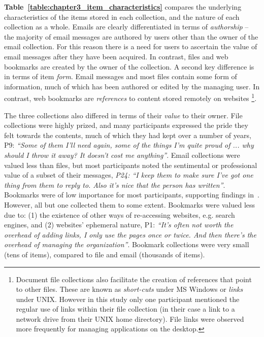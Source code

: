 \textbf{Table~\ref{table:chapter3_item_characteristics}} compares the underlying characteristics of the items stored in each collection, and the nature of each collection as a whole. 
Emails are clearly differentiated in terms of \textit{authorship} -- the majority of email messages are authored by users other than the owner of the email collection.
For this reason there is a need for users to ascertain the value of email messages after they have been acquired.  In contrast, files and web bookmarks are created by the owner of the collection.  
A second key difference is in terms of item \textit{form}. Email messages and most files contain some form of information, much of which has been authored or edited by the managing user. In contrast, web bookmarks are \textit{references} to content stored remotely on websites \footnote{Document file collections also facilitate the creation of references that point to other files. These are known as \textit{short-cuts} under MS Windows or \textit{links} under UNIX. However in this study only one participant mentioned the regular use of links within their file collection (in their case a link to a network drive from their UNIX home directory). File links were observed more frequently for managing applications on the desktop.}.

The three collections also differed in terms of their \textit{value} to their owner.  File collections were highly prized, and many participants expressed the pride they felt towards the contents, much of which they had kept over a number of years, P9: \textit{``Some of them I'll need again, some of the things I'm quite proud of ... why should I throw it away? It doesn't cost me anything''}. Email collections were valued less than files, but most participants noted the sentimental or professional value of a subset of their messages, \textit{P24: ``I keep them to make sure I've got one thing from them to reply to. Also it's nice that the person has written''}. Bookmarks were of low importance for most participants, supporting findings in~\citep{kftf:01}. However, all but one collected them to some extent. Bookmarks were valued less due to: (1) the existence of other ways of re-accessing websites, e.g. search engines, and (2) websites' ephemeral nature, P1: \textit{``It's often not worth the overhead of adding links, I only use the pages once or twice. And then there's the overhead of managing the organization''}.  Bookmark collections were very small (tens of items), compared to file and email (thousands of items). 


